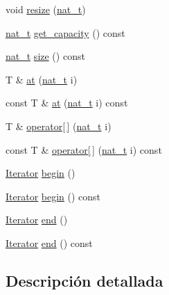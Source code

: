\begin{DoxyCompactItemize}
void \hyperlink{class_designar_1_1_fixed_array_af52fca1277e52d28ce6d46ed4a7b471e}{resize} (\hyperlink{namespace_designar_aa72662848b9f4815e7bf31a7cf3e33d1}{nat\+\_\+t})
\item 
\hyperlink{namespace_designar_aa72662848b9f4815e7bf31a7cf3e33d1}{nat\+\_\+t} \hyperlink{class_designar_1_1_fixed_array_ac262a6be77640c4da26cd49fe9b90db0}{get\+\_\+capacity} () const
\item 
\hyperlink{namespace_designar_aa72662848b9f4815e7bf31a7cf3e33d1}{nat\+\_\+t} \hyperlink{class_designar_1_1_fixed_array_a03ce71d0cc8f4155f117bbfe83bb95e8}{size} () const
\item 
T \& \hyperlink{class_designar_1_1_fixed_array_ae47f2f299aaef27f2decc88f2fd863a9}{at} (\hyperlink{namespace_designar_aa72662848b9f4815e7bf31a7cf3e33d1}{nat\+\_\+t} i)
\item 
const T \& \hyperlink{class_designar_1_1_fixed_array_a3a1dec650628273bf08b6656db0a9088}{at} (\hyperlink{namespace_designar_aa72662848b9f4815e7bf31a7cf3e33d1}{nat\+\_\+t} i) const
\item 
T \& \hyperlink{class_designar_1_1_fixed_array_a0116aa8effdf9fd0c56ef1a8c1fa2883}{operator\mbox{[}$\,$\mbox{]}} (\hyperlink{namespace_designar_aa72662848b9f4815e7bf31a7cf3e33d1}{nat\+\_\+t} i)
\item 
const T \& \hyperlink{class_designar_1_1_fixed_array_aac0021d1ca6ff704f3d6967a509fff6b}{operator\mbox{[}$\,$\mbox{]}} (\hyperlink{namespace_designar_aa72662848b9f4815e7bf31a7cf3e33d1}{nat\+\_\+t} i) const
\item 
\hyperlink{class_designar_1_1_fixed_array_1_1_iterator}{Iterator} \hyperlink{class_designar_1_1_fixed_array_a40c099038e41c839acca94bf352753fc}{begin} ()
\item 
\hyperlink{class_designar_1_1_fixed_array_1_1_iterator}{Iterator} \hyperlink{class_designar_1_1_fixed_array_afeedbafa8456c56f80716466191810d6}{begin} () const
\item 
\hyperlink{class_designar_1_1_fixed_array_1_1_iterator}{Iterator} \hyperlink{class_designar_1_1_fixed_array_ab0baaf67153a51cb98ac12918d2387a0}{end} ()
\item 
\hyperlink{class_designar_1_1_fixed_array_1_1_iterator}{Iterator} \hyperlink{class_designar_1_1_fixed_array_a02b4949630ddc32ba5971fd4b78cf8ab}{end} () const
\end{DoxyCompactItemize}


\subsection{Descripción detallada}
